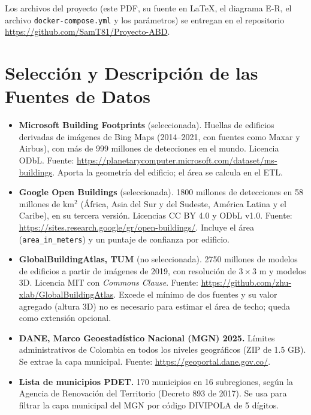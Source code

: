 \documentclass[11pt,letterpaper]{article}
\begin{document}
Los archivos del proyecto (este PDF, su fuente en \LaTeX{}, el diagrama E-R, el archivo
\texttt{docker-compose.yml} y los parámetros) se entregan en el repositorio
\url{https://github.com/SamT81/Proyecto-ABD}.

\section{Selección y Descripción de las Fuentes de Datos}

\begin{itemize}
  \item \textbf{Microsoft Building Footprints} (seleccionada). Huellas de edificios derivadas de
  imágenes de Bing Maps (2014--2021, con fuentes como Maxar y Airbus), con más de 999 millones de
  detecciones en el mundo. Licencia ODbL. Fuente:
  \url{https://planetarycomputer.microsoft.com/dataset/ms-buildings}. Aporta la geometría del
  edificio; el área se calcula en el ETL.

  \item \textbf{Google Open Buildings} (seleccionada). 1800 millones de detecciones en 58 millones
  de km$^2$ (África, Asia del Sur y del Sudeste, América Latina y el Caribe), en su tercera versión.
  Licencias CC BY 4.0 y ODbL v1.0. Fuente: \url{https://sites.research.google/gr/open-buildings/}.
  Incluye el área (\texttt{area\_in\_meters}) y un puntaje de confianza por edificio.

  \item \textbf{GlobalBuildingAtlas, TUM} (no seleccionada). 2750 millones de modelos de edificios
  a partir de imágenes de 2019, con resolución de $3\times3$ m y modelos 3D. Licencia MIT con
  \emph{Commons Clause}. Fuente: \url{https://github.com/zhu-xlab/GlobalBuildingAtlas}. Excede el
  mínimo de dos fuentes y su valor agregado (altura 3D) no es necesario para estimar el área de
  techo; queda como extensión opcional.

  \item \textbf{DANE, Marco Geoestadístico Nacional (MGN) 2025.} Límites administrativos de
  Colombia en todos los niveles geográficos (ZIP de 1.5 GB). Se extrae la capa municipal. Fuente:
  \url{https://geoportal.dane.gov.co/}.

  \item \textbf{Lista de municipios PDET.} 170 municipios en 16 subregiones, según la Agencia de
  Renovación del Territorio (Decreto 893 de 2017). Se usa para filtrar la capa municipal del MGN por
  código DIVIPOLA de 5 dígitos.
\end{itemize}
\end{document}
